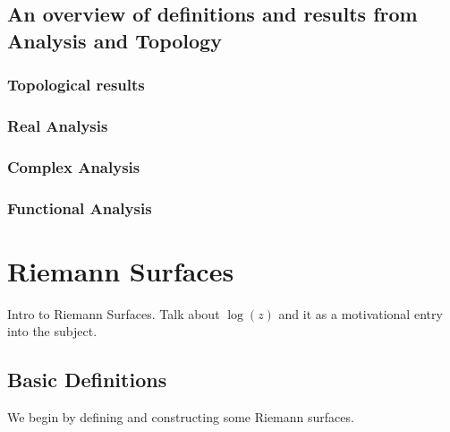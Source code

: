 \documentclass[11pt]{report}
\theoremstyle{definition}
\begin{document}
\section{An overview of definitions and results from Analysis and Topology}
\subsection{Topological results}
\subsection{Real Analysis}
\subsection{Complex Analysis}
\subsection{Functional Analysis}


\chapter{Riemann Surfaces}

Intro to Riemann Surfaces. Talk about $\log(z)$ and it as a motivational entry into the subject.


\section{Basic Definitions}\label{bdefns}

We begin by defining and constructing some Riemann surfaces.
\end{document}
